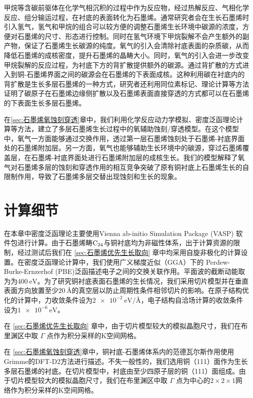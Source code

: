 甲烷等含碳前驱体在化学气相沉积的过程中作为反应物，经过热解反应、气相化学反应、组分输运过程，在衬底的表面转化为石墨烯。通常研究者会在生长石墨烯时引入氢气，氢气和甲烷的组合可以较方便的调整石墨烯生长环境中碳源的浓度，方便对石墨烯的尺寸、形态进行控制。同时在氢气环境下甲烷裂解不会产生额外的副产物，保证了石墨烯生长碳源的纯度。氧气的引入会清除衬底表面的杂质碳，从而降低石墨烯的成核密度，提升石墨烯的晶畴大小。同时，氧气的引入会进一步改变甲烷裂解的反应过程，为衬底下方的背扩散提供额外的碳源。通过背扩散的方式进入到铜-石墨烯界面之间的碳源会在石墨烯的下表面成核。这种利用碳在衬底内的背扩散是生长多层石墨烯的一种方式，研究者还利用同位素标记、理论计算等方法证明了碳原子在石墨烯边缘侧扩散以及石墨烯表面直接穿透的方式都可以在石墨烯的下表面生长多层石墨烯。

在\ref{sec:石墨烯氧蚀刻穿透}章中，我们利用化学反应动力学模拟、密度泛函理论计算等方法，建立了多层石墨烯生长过程中的氧辅助蚀刻/穿透模型。在这个模型中，氧气一方面能够通过交换作用，透过第一层石墨烯蚀刻处于石墨烯-衬底界面处的石墨烯附加层。另一方面，氧气也能够辅助生长环境中的碳源，穿过石墨烯覆盖层，在石墨烯-衬底界面处进行石墨烯附加层的成核生长。我们的模型解释了氧气对石墨烯多层的蚀刻和穿透作用的相互竞争突破了原有铜衬底上石墨烯生长的自限制作用，导致了石墨烯多层交替出现蚀刻和生长的现象。

\section{计算细节}
在本章中密度泛函理论主要使用Vienna ab-initio Simulation Package (VASP) 软件包进行计算。由于石墨烯畴$\rm{C_{24}}$与铜衬底均为非磁性体系，出于计算资源的限制，经过测试后我们在 \ref{sec:石墨烯优先生长取向} 章中均采用自旋非极化的计算设置。在密度泛函理论计算中，我们使用广义梯度近似（GGA）下的 Perdew-Burke-Ernzerhof (PBE)泛函描述电子之间的交换关联作用。平面波的截断动能取为为$\SI{400}{\electronvolt}$。为了研究铜衬底表面石墨烯的生长情况，我们采用切片模型并在垂直表面方向放置至少$\SI{20}{\angstrom}$的真空层以防止周期性条件相邻切片的影响。在原子结构优化的计算中，力收敛条件设为$\SI{2e-2}{\electronvolt \per \angstrom}$，电子结构自洽场计算的收敛条件设为$\SI{1e-6}{\electronvolt}$。

在 \ref{sec:石墨烯优先生长取向} 章中，由于切片模型较大的模拟晶胞尺寸，我们在布里渊区中取 $\Gamma$ 点作为积分采样的K空间网格。

在 \ref{sec:石墨烯氧蚀刻穿透}章中，铜衬底-石墨烯体系内的范德瓦尔斯作用使用Grimme的DFT-D2方法进行描述。不失一般性的，我们选用铜（111）面作为生长多层石墨烯的衬底。在切片模型中，衬底由至少四原子层的铜（111）面组成。由于切片模型较大的模拟晶胞尺寸，我们在布里渊区中取 $\Gamma$ 点为中心的$2\times 2\times 1$网络作为积分采样的K空间网格。

